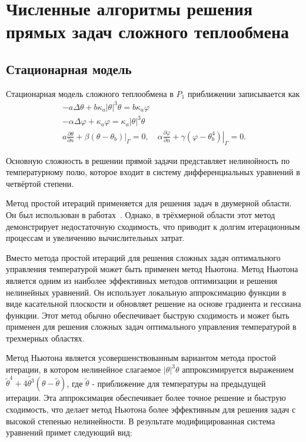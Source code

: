 \section{Численные алгоритмы решения прямых задач сложного теплообмена}
\label{sec:ch4/sec1}

\subsection{Стационарная модель}
\label{subsec:ch4/sec1/stationary}
Стационарная модель сложного теплообмена
в $P_1$ приближении записывается как
\[
    \begin{gathered}
        -a \Delta \theta+b \kappa_{a}| \theta|^{3} \theta =
        b \kappa_{a} \varphi \\
        -\alpha \Delta \varphi+\kappa_{a} \varphi =
        \kappa_{a}|\theta|^{3} \theta \\
        a \frac{\partial \theta}{\partial n}
        +\left.\beta\left(\theta-\theta_{b}\right)\right|_{\Gamma}=0,
        \quad \alpha \frac{\partial \varphi}{\partial n}
        +\left.\gamma\left(\varphi-\theta_{b}^{4}\right)\right|_{\Gamma}=0.
    \end{gathered}
\]

Основную сложность в решении прямой задачи представляет нелинойность
по температурному полю, которое входит в систему
дифференциальных уравнений в четвёртой степени.

Метод простой итераций применяется для решения задач в двумерной области.
Он был использован в работах~\cite{Kovtanyuk2015,astrakhantseva2014numerical}.
Однако, в трёхмерной области этот метод демонстрирует недостаточную сходимость,
что приводит к долгим итерационным процессам и увеличению вычислительных затрат.

Вместо метода простой итераций для решения сложных задач оптимального управления
температурой может быть применен метод Ньютона.
Метод Ньютона является одним из наиболее эффективных методов оптимизации
и решения нелинейных уравнений.
Он использует локальную аппроксимацию функции в виде касательной плоскости
и обновляет решение на основе градиента и гессиана функции.
Этот метод обычно обеспечивает быструю сходимость и может быть
применен для решения сложных задач оптимального
управления температурой в трехмерных областях.


Метод Ньютона является усовершенствованным вариантом метода простой итерации,
в котором нелинейное слагаемое $|\theta|^3 \theta$ аппроксимируется
выражением $\widetilde{\theta}^4+4 \widetilde{\theta^3}(\theta-\widetilde{\theta})$,
где $\widetilde{\theta}$ - приближение для температуры на предыдущей итерации.
Эта аппроксимация обеспечивает более точное решение и быструю сходимость,
что делает метод Ньютона более эффективным для
решения задач с высокой степенью нелинейности.
В результате модифицированная система уравнений примет следующий вид:

